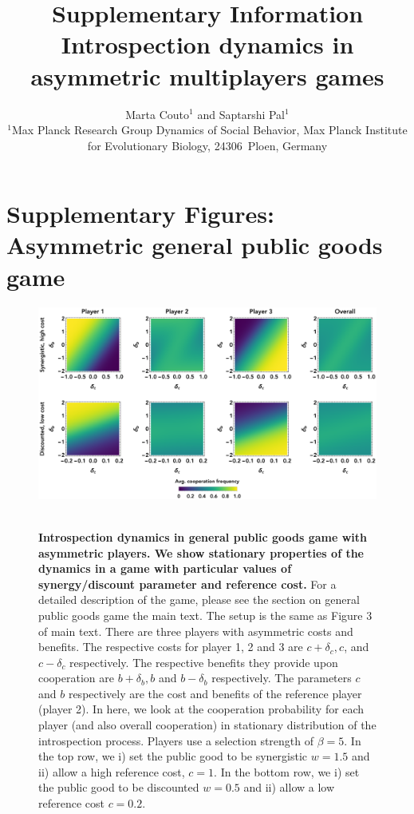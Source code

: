 \documentclass[11pt]{article}
\title{\sffamily \Large Supplementary Information\\[0.1cm] {\bfseries Introspection dynamics in asymmetric multiplayers games}}
\date{\empty}
\author{\parbox[c]{16cm}{\centering \onehalfspacing \fontsize{11}{12}\selectfont Marta Couto$^1$ and Saptarshi Pal$^1$\\[0.2cm]
$^1$Max Planck Research Group Dynamics of Social Behavior, Max Planck Institute for Evolutionary Biology, 24306~Ploen, Germany}}
\theoremstyle{plainCl1}
\theoremstyle{plainCl2}
\begin{document}
\maketitle
\onehalfspacing
\section*{Supplementary Figures: Asymmetric general public goods game}



\begin{figure}[h!]
\centering
\includegraphics[width =  \textwidth]{figures/Supfigure1.eps}~\\[0.4cm]
\caption{\onehalfspacing
\textbf{Introspection dynamics in general public goods game with asymmetric players. We show stationary properties of the dynamics in a game with particular values of synergy/discount parameter and reference cost.} For a detailed description of the game, please see the section on general public goods game the main text. The setup is the same as Figure 3 of main text. There are three players with asymmetric costs and benefits. The respective costs for player 1, 2 and 3 are $c + \delta_c, c$, and $c - \delta_c$ respectively. The respective benefits they provide upon cooperation are $b + \delta_b, b$ and $b - \delta_b$ respectively. The parameters $c$ and $b$ respectively are the cost and benefits of the reference player (player 2). In here, we look at the cooperation probability for each player (and also overall cooperation) in stationary distribution of the introspection process. Players use a selection strength of $\beta = 5$. In the top row, we i) set the public good to be synergistic $w = 1.5$ and ii) allow a high reference cost, $c = 1$. In the bottom row, we i) set the public good to be discounted $w = 0.5$ and ii) allow a low reference cost $c = 0.2$. }
 
\label{Fig:Supp-Fig1}
\end{figure}
\clearpage
\end{document}
